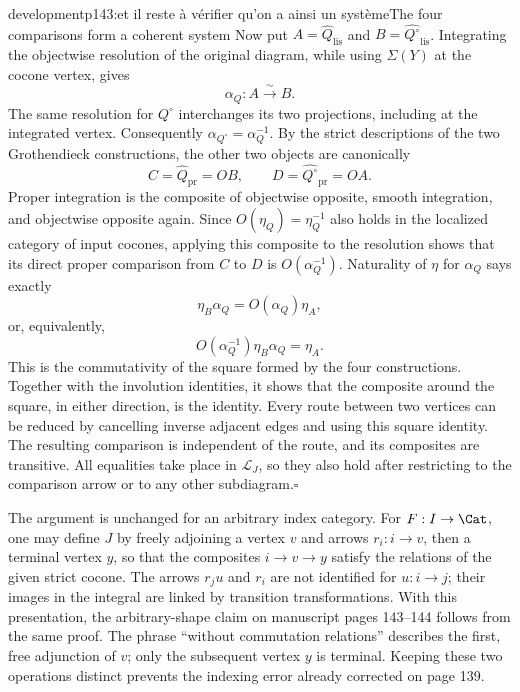 \begin{dcomment}{development}{p143:et il reste à vérifier qu'on a ainsi un système}{The four comparisons form a coherent system}
Now put $A=\widehat Q_{\mathrm{lis}}$ and $B=\widehat{Q^\circ}_{\mathrm{lis}}$. Integrating the objectwise resolution of the original diagram, while using $\Sigma(Y)$ at the cocone vertex, gives
\[
 \alpha_Q:A\xrightarrow{\sim}B.
\]
The same resolution for $Q^\circ$ interchanges its two projections, including at the integrated vertex. Consequently $\alpha_{Q^\circ}=\alpha_Q^{-1}$. By the strict descriptions of the two Grothendieck constructions, the other two objects are canonically
\[
 C=\widehat Q_{\mathrm{pr}}=OB,
 \qquad D=\widehat{Q^\circ}_{\mathrm{pr}}=OA.
\]
Proper integration is the composite of objectwise opposite, smooth integration, and objectwise opposite again. Since $O(\eta_Q)=\eta_Q^{-1}$ also holds in the localized category of input cocones, applying this composite to the resolution shows that its direct proper comparison from $C$ to $D$ is $O(\alpha_Q^{-1})$. Naturality of $\eta$ for $\alpha_Q$ says exactly
\[
 \eta_B\alpha_Q=O(\alpha_Q)\eta_A,
\]
or, equivalently,
\[
 O(\alpha_Q^{-1})\eta_B\alpha_Q=\eta_A.
\]
This is the commutativity of the square formed by the four constructions. Together with the involution identities, it shows that the composite around the square, in either direction, is the identity. Every route between two vertices can be reduced by cancelling inverse adjacent edges and using this square identity. The resulting comparison is independent of the route, and its composites are transitive. All equalities take place in $\mathcal L_J$, so they also hold after restricting to the comparison arrow or to any other subdiagram.\hfill$\square$

The argument is unchanged for an arbitrary index category. For $F:I\to\Cat$, one may define $J$ by freely adjoining a vertex $v$ and arrows $r_i:i\to v$, then a terminal vertex $y$, so that the composites $i\to v\to y$ satisfy the relations of the given strict cocone. The arrows $r_j u$ and $r_i$ are not identified for $u:i\to j$; their images in the integral are linked by transition transformations. With this presentation, the arbitrary-shape claim on manuscript pages 143--144 follows from the same proof. The phrase ``without commutation relations'' describes the first, free adjunction of $v$; only the subsequent vertex $y$ is terminal. Keeping these two operations distinct prevents the indexing error already corrected on page 139.
\end{dcomment}

